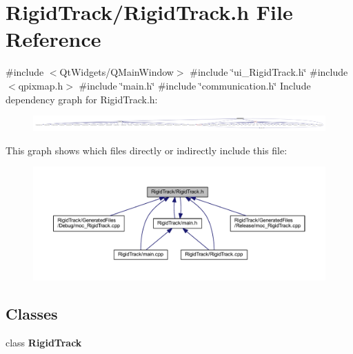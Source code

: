 \section{Rigid\+Track/\+Rigid\+Track.h File Reference}
\label{_rigid_track_8h}
{\ttfamily \#include $<$Qt\+Widgets/\+Q\+Main\+Window$>$}\newline
{\ttfamily \#include \char`\"{}ui\+\_\+\+Rigid\+Track.\+h\char`\"{}}\newline
{\ttfamily \#include $<$qpixmap.\+h$>$}\newline
{\ttfamily \#include \char`\"{}main.\+h\char`\"{}}\newline
{\ttfamily \#include \char`\"{}communication.\+h\char`\"{}}\newline
Include dependency graph for Rigid\+Track.\+h\+:\nopagebreak
\begin{figure}[H]
\begin{center}
\leavevmode
\includegraphics[width=350pt]{_rigid_track_8h__incl}
\end{center}
\end{figure}
This graph shows which files directly or indirectly include this file\+:\nopagebreak
\begin{figure}[H]
\begin{center}
\leavevmode
\includegraphics[width=350pt]{_rigid_track_8h__dep__incl}
\end{center}
\end{figure}
\subsection*{Classes}
\begin{DoxyCompactItemize}
\item 
class \textbf{ Rigid\+Track}
\end{DoxyCompactItemize}
